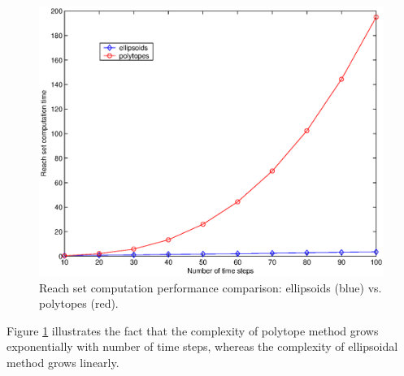 \begin{figure}[htbp]
\centerline{
\includegraphics[height=8 cm]{ellpoly.eps}}
\caption{Reach set computation performance comparison:
ellipsoids (blue) vs. polytopes (red).}
\label{ellpolyfig}
\end{figure}

Figure \ref{ellpolyfig}  illustrates  the fact that the
complexity of polytope method grows exponentially with number of time
steps, whereas the complexity of ellipsoidal method grows linearly.



